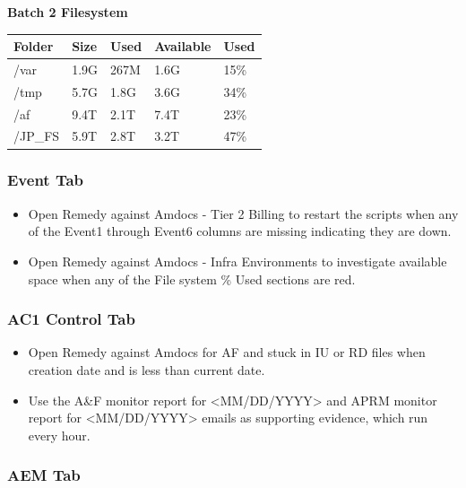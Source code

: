 \documentclass[12pt,twoside]{article}
\begin{document}
\begin{itemize}
    \textbf{Batch 2 Filesystem}\\

\begin{center}
\begin{tabular}{lllll}
\hline
 \textbf{Folder}  &  \textbf{Size}  &  \textbf{Used}  &  \textbf{Available}  &  \textbf{Used}  \\
\hline
 /var             &  1.9G           &  267M           &  1.6G                &  15\%           \\
 /tmp             &  5.7G           &  1.8G           &  3.6G                &  34\%           \\
 /af              &  9.4T           &  2.1T           &  7.4T                &  23\%           \\
 /JP\_FS          &  5.9T           &  2.8T           &  3.2T                &  47\%           \\
\hline
\end{tabular}
\end{center}


\end{itemize}
\subsubsection{Event Tab}
\label{sec-4-1-2}

\begin{itemize}
\item Open Remedy against Amdocs - Tier 2 Billing to restart the scripts when any of the Event1 through Event6 columns are missing indicating they are down.
\item Open Remedy against Amdocs - Infra Environments to investigate available space when any of the File system \% Used sections are red.
\end{itemize}
\subsubsection{AC1 Control Tab}
\label{sec-4-1-3}

\begin{itemize}
\item Open Remedy against Amdocs  for AF and stuck in IU or RD files when creation date and is less than current date.
\item Use the A\&F monitor report for <MM/DD/YYYY> and APRM monitor report for <MM/DD/YYYY> emails as supporting evidence, which run every hour.
\end{itemize}
\subsubsection{AEM Tab}
\label{sec-4-1-4}
\end{document}
